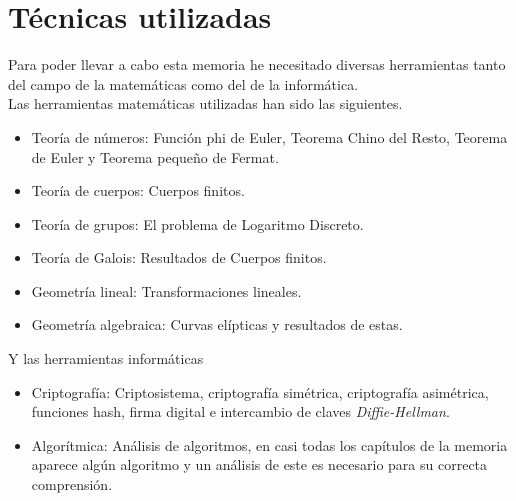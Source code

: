 \section{Técnicas utilizadas}
Para poder llevar a cabo esta memoria he necesitado diversas herramientas tanto del campo de la matemáticas como del de la informática.\\ 
Las herramientas matemáticas utilizadas han sido las siguientes.
\begin{itemize}
	\item Teoría de números: Función phi de Euler, Teorema Chino del Resto, Teorema de Euler y Teorema pequeño de Fermat.
	\item Teoría de cuerpos: Cuerpos finitos.
	\item Teoría de grupos: El problema de Logaritmo Discreto. 
	\item Teoría de Galois: Resultados de Cuerpos finitos.
	\item Geometría lineal: Transformaciones lineales.
	\item Geometría algebraica: Curvas elípticas y resultados de estas.
\end{itemize}

Y las herramientas informáticas
\begin{itemize}
	\item Criptografía: Criptosistema, criptografía simétrica, criptografía asimétrica, funciones hash, firma digital e intercambio de claves \emph{Diffie-Hellman}. 
	\item Algorítmica: Análisis de algoritmos, en casi todas los capítulos de la memoria aparece algún algoritmo y un análisis de este es necesario para su correcta comprensión.
\end{itemize}

		
